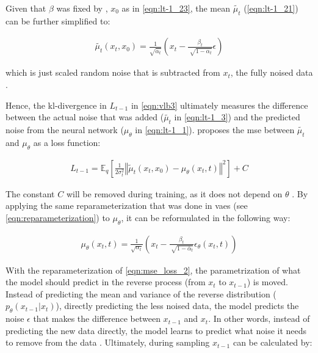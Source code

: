 \noindent Given that $\beta$ was fixed by \textcite{ho2020DenoisingDiffusionProbabilistic}, $x_0$ as in \autoref{eqn:lt-1_23}, the mean $\tilde{\mu_t}$ (\autoref{eqn:lt-1_21}) can be further simplified to:

\begin{equation}
  \begin{align}
    \label{eqn:lt-1_3}
    \tilde{\mu_t}(x_t, x_0) = \frac{1}{\sqrt{\bar{\alpha}_t}}(x_t - \frac{\beta_t}{\sqrt[]{1-\bar{\alpha}_t}}\epsilon)
  \end{align}
\end{equation}

\noindent which is just scaled random noise that is subtracted from $x_t$, the fully noised data \cite{ho2020DenoisingDiffusionProbabilistic}.

Hence, the \gls{kl}-divergence in $L_{t-1}$ in \autoref{eqn:vlb3} ultimately measures the difference between the actual noise that was added ($\tilde{\mu_t}$ in \autoref{eqn:lt-1_3}) and the predicted noise from the neural network ($\mu_\theta$ in \autoref{eqn:lt-1_1}).
\textcite{ho2020DenoisingDiffusionProbabilistic} proposes the \gls{mse} between $\tilde{\mu_t}$ and $\mu_\theta$ as a loss function:

\begin{equation}
  \begin{align}
    \label{eqn:mse_loss}
    L_{t-1} = \mathbb{E}_q \left[ \frac{1}{2\sigma_t^2} \left\Vert \tilde{\mu}_t(x_t, x_0) - \mu_\theta(x_t, t) \right\Vert^2 \right] + C
  \end{align}
\end{equation}

\noindent The constant $C$ will be removed during training, as it does not depend on $\theta$ \cite{ho2020DenoisingDiffusionProbabilistic}.
By applying the same reparameterization that was done in \glspl{vae} (see \autoref{eqn:reparameterization}) to $\mu_\theta$, it can be reformulated in the following way:

\begin{equation}
  \begin{align}
    \label{eqn:mse_loss_2}
    \mu_\theta(x_t,t)= \frac{1}{\sqrt{\alpha_t}}(x_t - \frac{\beta_t}{\sqrt[]{1-\bar{\alpha}_t}}\epsilon_\theta(x_t,t)) 
  \end{align}
\end{equation}

With the reparameterization of \autoref{eqn:mse_loss_2}, the parametrization of what the model should predict in the reverse process (from $x_t$ to $x_{t-1}$) is moved. 
Instead of predicting the mean and variance of the reverse distribution ($p_\theta(x_{t-1}|x_t)$), \ie directly predicting the less noised data, 
the model predicts the noise $\epsilon$ that makes the difference between $x_{t-1}$ and ${x_t}$.
In other words, instead of predicting the new data directly, the model learns to predict what noise it needs to remove from the data \cite{capel2022MasterThesisDenoising}.
Ultimately, during sampling $x_{t-1}$ can be calculated by:

